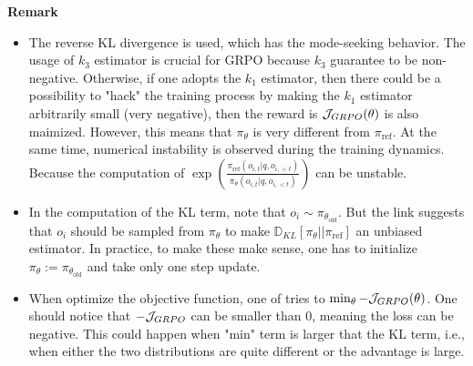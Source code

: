 \textbf{Remark}
\begin{itemize}
    \item The reverse KL divergence is used, which has the mode-seeking behavior. The usage of $k_3$ estimator is crucial for GRPO because $k_3$ guarantee to be non-negative. Otherwise, if one adopts the $k_1$ estimator, then there could be a possibility to "hack" the training process by making the $k_1$ estimator arbitrarily small (very negative), then the reward is ${\cal J}_{GRPO}(\theta)$ is also maimized. However, this means that $\pi_\theta$ is very different from  $\pi_{\text{ref}}$.  At the same time, numerical instability is observed during the training dynamics. Because the computation of $\exp \left(\frac{\pi_{\text{ref}}\left(o_{i, t} | q, o_{i,<t}\right)}{\pi_\theta\left(o_{i, t} | q, o_{i,<t}\right)}\right)$ can be unstable.
    \item In the computation of the KL term, note that $o_i\sim \pi_{\theta_{\text{old}}}$. But the link suggests that $o_i$ should be sampled from $\pi_\theta$ to make $\mathbb{D}_{K L}\left[\pi_\theta| | \pi_{\text{ref}}\right]$ an unbiased estimator. In practice, to make these make sense, one has to initialize $\pi_\theta :=\pi_{\theta_{\text{old}}}$ and take only one step update.
    \item When optimize the objective function, one of tries to $\min_{\theta} -{\cal J}_{GRPO}(\theta)$. One should notice that $-{\cal J}_{GRPO}$ can be smaller than $0$, meaning the loss can be negative. This could happen when "min" term is larger that the KL term, i.e., when either the two distributions are quite different or the advantage is large.
\end{itemize}